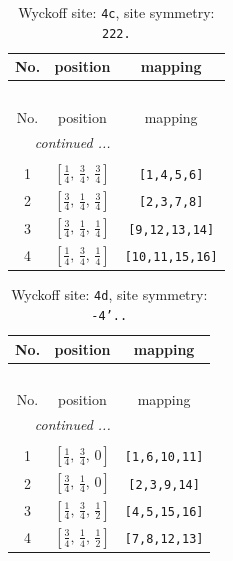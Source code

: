 \documentclass[fleqn,8pt]{jsarticle}
\begin{document}
\renewcommand{\arraystretch}{1.2}
\begin{longtable}{ccc}
\caption{Wyckoff site: {\tt 4c}, site symmetry: {\tt 222.}}
 \\
 \hline \hline
No. & position & mapping \\ \hline \endfirsthead

\multicolumn{2}{l}{\tablename\ \thetable{}} \\
 \hline \hline
No. & position & mapping \\ \hline \endhead

 \hline \hline
\multicolumn{2}{r}{\footnotesize\it continued ...} \\ \endfoot

 \hline \hline
\multicolumn{2}{r}{} \\ \endlastfoot

1 & $\left[ \frac{1}{4},\, \frac{3}{4},\, \frac{3}{4} \right]$ & {\tt [1,4,5,6]} \\ \hline
2 & $\left[ \frac{3}{4},\, \frac{1}{4},\, \frac{3}{4} \right]$ & {\tt [2,3,7,8]} \\ \hline
3 & $\left[ \frac{3}{4},\, \frac{1}{4},\, \frac{1}{4} \right]$ & {\tt [9,12,13,14]} \\ \hline
4 & $\left[ \frac{1}{4},\, \frac{3}{4},\, \frac{1}{4} \right]$ & {\tt [10,11,15,16]} \\
\end{longtable}
\renewcommand{\arraystretch}{1.2}
\begin{longtable}{ccc}
\caption{Wyckoff site: {\tt 4d}, site symmetry: {\tt -4'..}}
 \\
 \hline \hline
No. & position & mapping \\ \hline \endfirsthead

\multicolumn{2}{l}{\tablename\ \thetable{}} \\
 \hline \hline
No. & position & mapping \\ \hline \endhead

 \hline \hline
\multicolumn{2}{r}{\footnotesize\it continued ...} \\ \endfoot

 \hline \hline
\multicolumn{2}{r}{} \\ \endlastfoot

1 & $\left[ \frac{1}{4},\, \frac{3}{4},\, 0 \right]$ & {\tt [1,6,10,11]} \\ \hline
2 & $\left[ \frac{3}{4},\, \frac{1}{4},\, 0 \right]$ & {\tt [2,3,9,14]} \\ \hline
3 & $\left[ \frac{1}{4},\, \frac{3}{4},\, \frac{1}{2} \right]$ & {\tt [4,5,15,16]} \\ \hline
4 & $\left[ \frac{3}{4},\, \frac{1}{4},\, \frac{1}{2} \right]$ & {\tt [7,8,12,13]} \\
\end{longtable}
\end{document}
